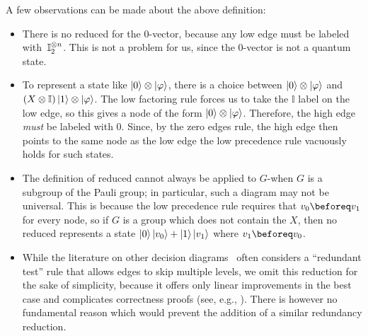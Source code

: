 A few observations can be made about the above definition:
	\begin{itemize}
            \setlength\itemsep{1em}
		\item[\namedlabel{obs:nozero}{O1}] There is no reduced \limdd for the $0$-vector, because any low edge must be labeled with~$\id[2]^{\otimes n}$. This is not a problem for us, since the $0$-vector is not a quantum state.
		\item[\namedlabel{obs:knife}{O2}] To represent a state like $\ket{0}\otimes\ket{\phi}$, there is a choice between $\ket{0}\otimes\ket{\phi}$ and $(X\otimes\mathbb I)\ket{1}\otimes \ket{\phi}$.
The low factoring rule forces us to take the $\mathbb I$ label on the low edge, so this gives a node of the form $\ket{0}\otimes \ket{\phi}$. Therefore, the high edge \emph{must} be labeled with $0$. Since, by the zero edges rule, the high edge then points to the same node as the low edge the low precedence rule vacuously holds for such states.
		\item[\namedlabel{obs:subgroups}{O3}] The definition of reduced \limdd cannot always be applied to $G$-\limdd when $G$ is a subgroup of the Pauli group; in particular, such a diagram may not be universal. This is because the low precedence rule requires that $v_0\beforeq v_1$ for every node, so if $G$ is a group which does not contain the $X$, then no reduced \glimdd represents a state $\ket 0 \ket {v_0} + \ket 1 \ket {v_1}$ where $v_1 \beforeq v_0$.
\item[\namedlabel{obs:delete}{O4}] While the literature on other decision diagrams~\cite{akers1978binary,bryant86,feinstein2011skipped} often considers a ``redundant test'' rule that allows edges to skip multiple levels, we omit this reduction for the sake of simplicity, because it offers only linear improvements in the best case and complicates correctness proofs (see, e.g., \cite[Lemma 1]{andersen1997introduction}). There is however no fundamental reason which would prevent the addition of a similar redundancy reduction.
\end{itemize}


